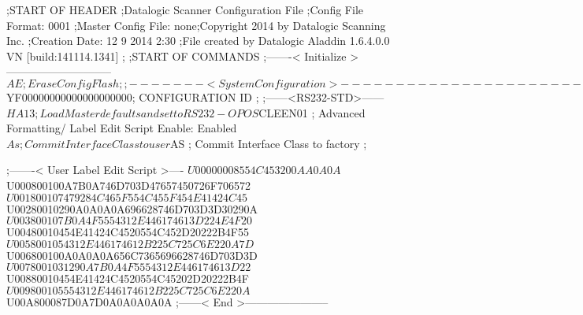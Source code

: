 ;START OF HEADER
;Datalogic Scanner Configuration File
;Config File Format: 0001
;Master Config File: none;Copyright 2014 by Datalogic Scanning Inc.
;Creation Date: 12 9 2014 2:30
;File created by Datalogic Aladdin 1.6.4.0.0 VN [build:141114.1341]
;
;START OF COMMANDS
;-------< Initialize >-----------------------------
$AE                 ; Erase Config Flash
;
;-------< System Configuration >-------------------------------
$YF00000000000000000000; CONFIGURATION ID
;
;------<RS232-STD>------
$HA13               ; Load Master defaults and set to RS232-OPOS
$CLEEN01            ; Advanced Formatting/ Label Edit Script Enable: Enabled
$As                 ; Commit Interface Class to user
$AS                 ; Commit Interface Class to factory
;

;-------< User Label Edit Script >----
$U00000008554C453200AA0A0A
$U000800100A7B0A746D703D47657450726F706572
$U001800107479284C465F554C455F454E41424C45
$U00280010290A0A0A0A696628746D703D3D30290A
$U003800107B0A4F5554312E446174613D224E4F20
$U00480010454E41424C4520554C452D20222B4F55
$U0058001054312E446174612B225C725C6E220A7D
$U006800100A0A0A0A656C7365696628746D703D3D
$U0078001031290A7B0A4F5554312E446174613D22
$U00880010454E41424C4520554C45202D20222B4F
$U009800105554312E446174612B225C725C6E220A
$U00A800087D0A7D0A0A0A0A0A
;------< End >-----------------------
